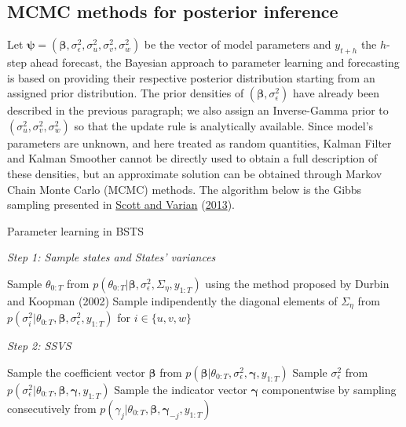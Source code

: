 \documentclass[
  12pt,
]{book}
\theoremstyle{break}
\theoremstyle{nonumberplain}
\begin{document}
\subsection{MCMC methods for posterior inference}\label{MCMC methods for posterior inference}

Let
\(\boldsymbol{\psi}=(\boldsymbol{\beta},\sigma^{2}_{\epsilon},\sigma^{2}_{u},\sigma^{2}_{v},\sigma^{2}_{w})\)
be the vector of model parameters and \(y_{t+h}\) the \(h\)-step ahead
forecast, the Bayesian approach to parameter learning and forecasting is
based on providing their respective posterior distribution starting from
an assigned prior distribution. The prior densities of
\((\boldsymbol{\beta},\sigma^{2}_{\epsilon})\) have already been
described in the previous paragraph; we also assign an Inverse-Gamma
prior to \((\sigma^{2}_{u},\sigma^{2}_{v},\sigma^{2}_{w})\) so that the
update rule is analytically available. Since model's parameters are
unknown, and here treated as random quantities, Kalman Filter and Kalman
Smoother cannot be directly used to obtain a full description of these
densities, but an approximate solution can be obtained through Markov
Chain Monte Carlo (MCMC) methods. The algorithm below is the Gibbs
sampling presented in \protect\hyperlink{ref-scott_varian_2013}{Scott
and Varian} (\protect\hyperlink{ref-scott_varian_2013}{2013}).

\begin{algorithm}
\caption{Parameter learning in BSTS} \label{alg:BSTS}
\begin{center}
\emph{Step 1: Sample states and States' variances}\\
\end{center}
\nl Sample $\theta_{0:T}$ from $p(\theta_{0:T}|\boldsymbol{\beta},\sigma^{2}_{\epsilon},\Sigma_{\eta},y_{1:T})$ using the method proposed by Durbin and Koopman (2002)\;
\nl Sample indipendently the diagonal elements of $\Sigma_{\eta}$ from $p(\sigma^{2}_{i}|\theta_{0:T},\boldsymbol{\beta},\sigma^{2}_{\epsilon},y_{1:T})$ for $i \in \{u,v,w\}$\;
\begin{center}
\emph{Step 2: SSVS}\\
\end{center}
\nl Sample the coefficient vector $\boldsymbol{\beta}$ from $p(\boldsymbol{\beta}|\theta_{0:T},\sigma^{2}_{\epsilon},\boldsymbol{\gamma},y_{1:T})$\;
\nl Sample $\sigma^{2}_{\epsilon}$ from $p(\sigma^{2}_{\epsilon}|\theta_{0:T},\boldsymbol{\beta},\boldsymbol{\gamma},y_{1:T})$\;
\nl Sample the indicator vector $\boldsymbol\gamma$ componentwise by sampling consecutively from $p(\gamma_{j}|\theta_{0:T},\boldsymbol\beta,\boldsymbol\gamma_{-j},y_{1:T})$
\end{algorithm}
\end{document}

